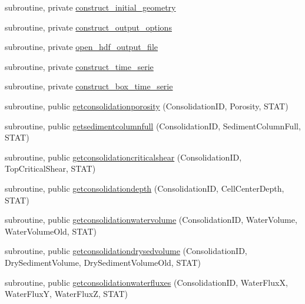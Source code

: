 \begin{DoxyCompactItemize}
\item 
subroutine, private \mbox{\hyperlink{namespacemoduleconsolidation_aefbb1dd3cecd84ab6814af87893b00d1}{construct\+\_\+initial\+\_\+geometry}}
\item 
subroutine, private \mbox{\hyperlink{namespacemoduleconsolidation_a29241b472f688e15c435e72ca5da5273}{construct\+\_\+output\+\_\+options}}
\item 
subroutine, private \mbox{\hyperlink{namespacemoduleconsolidation_a815002368bde1f9440c793d1c3f03f37}{open\+\_\+hdf\+\_\+output\+\_\+file}}
\item 
subroutine, private \mbox{\hyperlink{namespacemoduleconsolidation_a7138aa2bb0b64953d0ca37c18692d505}{construct\+\_\+time\+\_\+serie}}
\item 
subroutine, private \mbox{\hyperlink{namespacemoduleconsolidation_a37594ccd5d2f08cccc42657f65ec2387}{construct\+\_\+box\+\_\+time\+\_\+serie}}
\item 
subroutine, public \mbox{\hyperlink{namespacemoduleconsolidation_a47de60bcd271300a187a9ce6257be08e}{getconsolidationporosity}} (Consolidation\+ID, Porosity, S\+T\+AT)
\item 
subroutine, public \mbox{\hyperlink{namespacemoduleconsolidation_ae9552437552ade51a4c1aefcb033a0e7}{getsedimentcolumnfull}} (Consolidation\+ID, Sediment\+Column\+Full, S\+T\+AT)
\item 
subroutine, public \mbox{\hyperlink{namespacemoduleconsolidation_a9ca5460ab4ca639ac19eb7de5aea9bf6}{getconsolidationcriticalshear}} (Consolidation\+ID, Top\+Critical\+Shear, S\+T\+AT)
\item 
subroutine, public \mbox{\hyperlink{namespacemoduleconsolidation_a7d4c44834bf2eef5548235e522170c91}{getconsolidationdepth}} (Consolidation\+ID, Cell\+Center\+Depth, S\+T\+AT)
\item 
subroutine, public \mbox{\hyperlink{namespacemoduleconsolidation_a26b0c6595143115c8e9db2d46e42ba05}{getconsolidationwatervolume}} (Consolidation\+ID, Water\+Volume, Water\+Volume\+Old, S\+T\+AT)
\item 
subroutine, public \mbox{\hyperlink{namespacemoduleconsolidation_a34d40947baf053926b3fe4e02b7c1225}{getconsolidationdrysedvolume}} (Consolidation\+ID, Dry\+Sediment\+Volume, Dry\+Sediment\+Volume\+Old, S\+T\+AT)
\item 
subroutine, public \mbox{\hyperlink{namespacemoduleconsolidation_ab2cf2636db758f412f7c627b38eb6231}{getconsolidationwaterfluxes}} (Consolidation\+ID, Water\+FluxX, Water\+FluxY, Water\+FluxZ, S\+T\+AT)
\item 

\end{DoxyCompactItemize}

